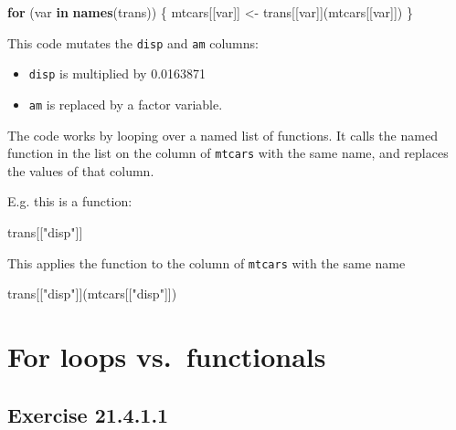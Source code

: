 \documentclass[]{book}
\newenvironment{Shaded}{\begin{snugshade}}{\end{snugshade}}
\newcommand{\ControlFlowTok}[1]{\textcolor[rgb]{0.13,0.29,0.53}{\textbf{#1}}}
\newcommand{\KeywordTok}[1]{\textcolor[rgb]{0.13,0.29,0.53}{\textbf{#1}}}
\newcommand{\NormalTok}[1]{#1}
\newcommand{\StringTok}[1]{\textcolor[rgb]{0.31,0.60,0.02}{#1}}
\providecommand{\tightlist}{%
  \setlength{\itemsep}{0pt}\setlength{\parskip}{0pt}}
\theoremstyle{plain}
\theoremstyle{remark}
\begin{document}
\begin{Shaded}
\begin{Highlighting}[]
\ControlFlowTok{for}\NormalTok{ (var }\ControlFlowTok{in} \KeywordTok{names}\NormalTok{(trans)) \{}
\NormalTok{  mtcars[[var]] <-}\StringTok{ }\NormalTok{trans[[var]](mtcars[[var]])}
\NormalTok{\}}
\end{Highlighting}
\end{Shaded}

This code mutates the \texttt{disp} and \texttt{am} columns:

\begin{itemize}
\tightlist
\item
  \texttt{disp} is multiplied by 0.0163871
\item
  \texttt{am} is replaced by a factor variable.
\end{itemize}

The code works by looping over a named list of functions. It calls the
named function in the list on the column of \texttt{mtcars} with the
same name, and replaces the values of that column.

E.g. this is a function:

\begin{Shaded}
\begin{Highlighting}[]
\NormalTok{trans[[}\StringTok{"disp"}\NormalTok{]]}
\end{Highlighting}
\end{Shaded}

This applies the function to the column of \texttt{mtcars} with the same
name

\begin{Shaded}
\begin{Highlighting}[]
\NormalTok{trans[[}\StringTok{"disp"}\NormalTok{]](mtcars[[}\StringTok{"disp"}\NormalTok{]])}
\end{Highlighting}
\end{Shaded}

\hypertarget{for-loops-vs.functionals}{%
\section{For loops vs.~functionals}\label{for-loops-vs.functionals}}

\hypertarget{exercise-21.4.1.1}{%
\subsection*{\texorpdfstring{Exercise
{21.4.1.1}}{Exercise 21.4.1.1}}\label{exercise-21.4.1.1}}
\end{document}
